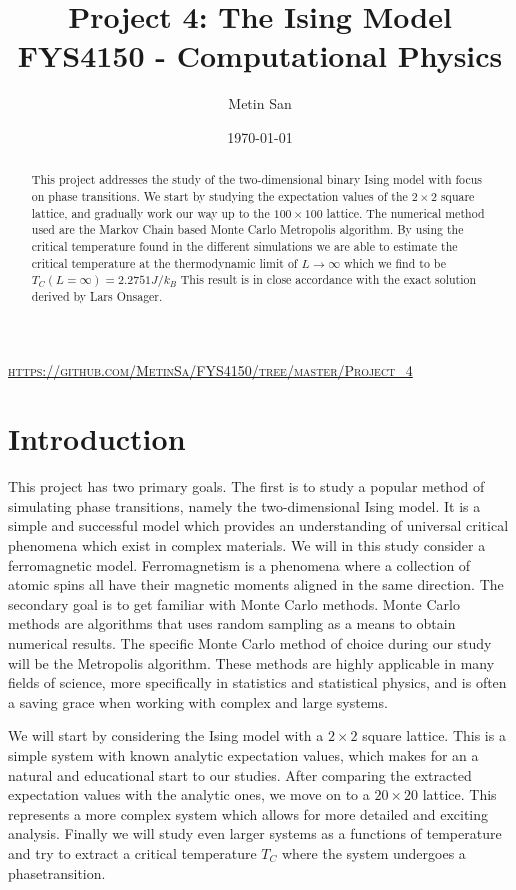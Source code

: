 \documentclass[a4paper, 10pt, reqno]{amsart}
\title[The Ising Model]{\Large{Project 4: The Ising Model} \\
\normalsize{FYS4150 - Computational Physics}}
\author[San]{Metin San}
\date{\today}
\begin{document}
\maketitle
\begin{center}
    \textsc{\url{https://github.com/MetinSa/FYS4150/tree/master/Project_4}}
\end{center}

\begin{abstract}
    This project addresses the study of the two-dimensional binary Ising model with focus on phase transitions. We start by studying the expectation values of the $2 \times 2$ square lattice, and gradually work our way up to the $100 \times 100$ lattice. The numerical method used are the Markov Chain based Monte Carlo Metropolis algorithm. By using the critical temperature found in the different simulations we are able to estimate the critical temperature at the thermodynamic limit of $L \rightarrow \infty$ which we find to be $T_C(L = \infty) = 2.2751 J/k_B$ This result is in close accordance with the exact solution derived by Lars Onsager.
\end{abstract}

\section{Introduction}

This project has two primary goals. The first is to study a popular method
of simulating phase transitions, namely the two-dimensional Ising model.
It is a simple and successful model which provides an understanding of
universal critical phenomena which exist in complex materials. We will in
this study consider a ferromagnetic model. Ferromagnetism is a phenomena
where a collection of atomic spins all have their magnetic moments aligned
in the same direction.
The secondary goal is to get familiar with Monte Carlo methods. Monte
Carlo methods are algorithms that uses random sampling as a means to
obtain numerical results. The specific Monte Carlo method of choice during
our study will be the Metropolis algorithm. These methods are highly
applicable in many fields of science, more specifically in statistics and
statistical physics, and is often a saving grace when working with complex
and large systems.

We will start by considering the Ising model with a $2 \times 2$ square
lattice. This is a simple system with known analytic expectation values,
which makes for an a natural and educational start to our studies. After
comparing the extracted expectation values with the analytic ones, we move
on to a $20 \times 20$ lattice. This represents a more complex system
which allows for more detailed and exciting analysis. Finally we will
study even larger systems as a functions of temperature and try to extract
a critical temperature $T_C$ where the system undergoes a phasetransition.
\end{document}
